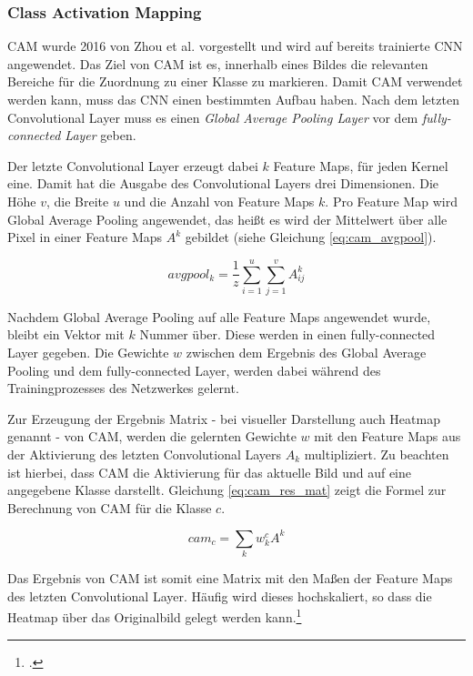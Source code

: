 \subsubsection{Class Activation Mapping}
\ac{CAM} wurde 2016 von Zhou et al. vorgestellt und wird auf bereits trainierte \ac{CNN} angewendet. Das Ziel von \ac{CAM} ist es, innerhalb eines Bildes die relevanten Bereiche für die Zuordnung zu einer Klasse zu markieren. Damit \ac{CAM} verwendet werden kann, muss das \ac{CNN} einen bestimmten Aufbau haben. Nach dem letzten Convolutional Layer muss es einen \textit{Global Average Pooling Layer} vor dem \textit{fully-connected Layer} geben. 

Der letzte Convolutional Layer erzeugt dabei $k$ Feature Maps, für jeden Kernel eine. Damit hat die Ausgabe des Convolutional Layers drei Dimensionen. Die Höhe $v$, die Breite $u$ und die Anzahl von Feature Maps $k$. Pro Feature Map wird Global Average Pooling angewendet, das heißt es wird der Mittelwert über alle Pixel in einer Feature Maps $A^k$ gebildet (siehe Gleichung \ref{eq:cam_avgpool}).

\begin{equation}
    \label{eq:cam_avgpool}
    avgpool_k = \frac{1}{z} \sum_{i=1}^{u} \sum_{j=1}^{v} A_{i j}^{k}
\end{equation}

Nachdem Global Average Pooling auf alle Feature Maps angewendet wurde, bleibt ein Vektor mit $k$ Nummer über. Diese werden in einen fully-connected Layer gegeben. Die Gewichte $w$ zwischen dem Ergebnis des Global Average Pooling und dem fully-connected Layer, werden dabei während des Trainingprozesses des Netzwerkes gelernt.

Zur Erzeugung der Ergebnis Matrix - bei visueller Darstellung auch Heatmap genannt - von \ac{CAM}, werden die gelernten Gewichte $w$ mit den Feature Maps aus der Aktivierung des letzten Convolutional Layers $A_k$ multipliziert. Zu beachten ist hierbei, dass \ac{CAM} die Aktivierung für das aktuelle Bild und auf eine angegebene Klasse darstellt. Gleichung \ref{eq:cam_res_mat} zeigt die Formel zur Berechnung von \ac{CAM} für die Klasse $c$.

\begin{equation}
    \label{eq:cam_res_mat}
    cam_c = \sum_{k} w_k^cA^k
\end{equation}

Das Ergebnis von \ac{CAM} ist somit eine Matrix mit den Maßen der Feature Maps des letzten Convolutional Layer. Häufig wird dieses hochskaliert, so dass die Heatmap über das Originalbild gelegt werden kann.\footcite[Vgl.][S. 2-4]{zhouLearningDeepFeatures2016}

